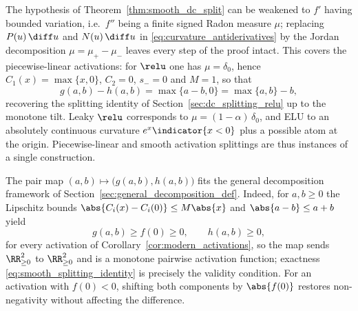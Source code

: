 \begin{remark}\label{rem:bv_extension}
The hypothesis of Theorem~\ref{thm:smooth_dc_split} can be weakened to $f'$ having bounded variation, i.e.\ $f''$ being a finite signed Radon measure $\mu$; replacing $P(u)\,\diff u$ and $N(u)\,\diff u$ in \eqref{eq:curvature_antiderivatives} by the Jordan decomposition $\mu = \mu_+ - \mu_-$ leaves every step of the proof intact. This covers the piecewise-linear activations: for $\relu$ one has $\mu = \delta_0$, hence $C_1(x) = \max\{x, 0\}$, $C_2 = 0$, $s_- = 0$ and $M = 1$, so that
\begin{equation*}
	g(a,b) - h(a,b) = \max\{a - b, 0\} = \max\{a, b\} - b,
\end{equation*}
recovering the splitting identity of Section~\ref{sec:dc_splitting_relu} up to the monotone tilt. Leaky $\relu$ corresponds to $\mu = (1 - \alpha)\,\delta_0$, and ELU to an absolutely continuous curvature $e^{x} \indicator{x < 0}$ plus a possible atom at the origin. Piecewise-linear and smooth activation splittings are thus instances of a single construction.
\end{remark}

\begin{remark}\label{rem:smooth_valid_decomposition}
The pair map $(a,b) \mapsto \bigl(g(a,b), h(a,b)\bigr)$ fits the general decomposition framework of Section~\ref{sec:general_decomposition_def}. Indeed, for $a, b \ge 0$ the Lipschitz bounds $\abs{C_i(x) - C_i(0)} \le M \abs{x}$ and $\abs{a - b} \le a + b$ yield
\begin{equation*}
	g(a,b) \ge f(0) \ge 0,
	\qquad
	h(a,b) \ge 0,
\end{equation*}
for every activation of Corollary~\ref{cor:modern_activations}, so the map sends $\RR^2_{\ge 0}$ to $\RR^2_{\ge 0}$ and is a monotone pairwise activation function; exactness \eqref{eq:smooth_splitting_identity} is precisely the validity condition. For an activation with $f(0) < 0$, shifting both components by $\abs{f(0)}$ restores non-negativity without affecting the difference.
\end{remark}
